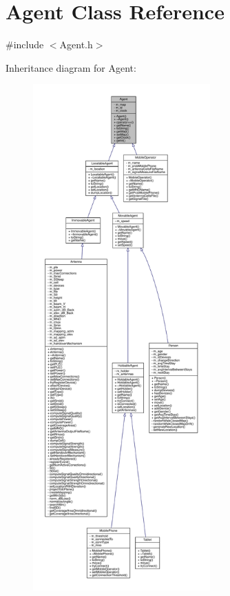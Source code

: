\hypertarget{class_agent}{}\section{Agent Class Reference}
\label{class_agent}


{\ttfamily \#include $<$Agent.\+h$>$}



Inheritance diagram for Agent\+:\nopagebreak
\begin{figure}[H]
\begin{center}
\leavevmode
\includegraphics[height=550pt]{class_agent__inherit__graph}
\end{center}
\end{figure}


